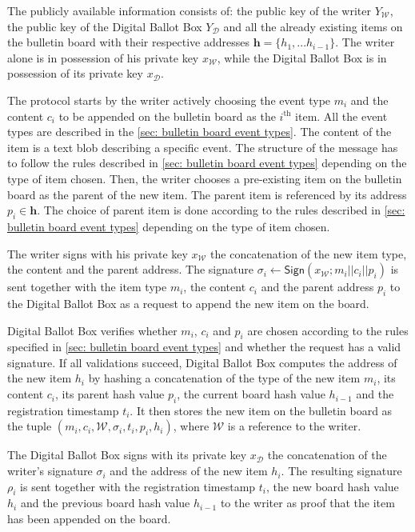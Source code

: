 The publicly available information consists of: the public key of the writer $Y_\mathcal{W}$, the public key of the Digital Ballot Box $Y_\mathcal{D}$ and all the already existing items on the bulletin board with their respective addresses $\boldsymbol{h} = \{h_1, ... h_{i-1}\}$. The writer alone is in possession of his private key $x_\mathcal{W}$, while the Digital Ballot Box is in possession of its private key $x_\mathcal{D}$.

The protocol starts by the writer actively choosing the event type $m_i$ and the content $c_i$ to be appended on the bulletin board as the $i^\mathrm{th}$ item. All the event types are described in the \cref{sec: bulletin board event types}. The content of the item is a text blob describing a specific event. The structure of the message has to follow the rules described in \cref{sec: bulletin board event types} depending on the type of item chosen. Then, the writer chooses a pre-existing item on the bulletin board as the parent of the new item. The parent item is referenced by its address $p_i \in \boldsymbol{h}$. The choice of parent item is done according to the rules described in \cref{sec: bulletin board event types} depending on the type of item chosen.

The writer signs with his private key $x_\mathcal{W}$ the concatenation of the new item type, the content and the parent address. The signature $\sigma_i \gets \mathsf{Sign}(x_\mathcal{W}; m_i || c_i || p_i)$ is sent together with the item type $m_i$, the content $c_i$ and the parent address $p_i$ to the Digital Ballot Box as a request to append the new item on the board.

Digital Ballot Box verifies whether $m_i$, $c_i$ and $p_i$ are chosen according to the rules specified in \cref{sec: bulletin board event types} and whether the request has a valid signature. If all validations succeed, Digital Ballot Box computes the address of the new item $h_i$ by hashing a concatenation of the type of the new item $m_i$, its content $c_i$, its parent hash value $p_i$, the current board hash value $h_{i-1}$ and the registration timestamp $t_i$. It then stores the new item on the bulletin board as the tuple $(m_i, c_i, \mathcal{W}, \sigma_i, t_i, p_i, h_i)$, where $\mathcal{W}$ is a reference to the writer.

The Digital Ballot Box signs with its private key $x_\mathcal{D}$ the concatenation of the writer's signature $\sigma_i$ and the address of the new item $h_i$. The resulting signature $\rho_i$ is sent together with the registration timestamp $t_i$, the new board hash value $h_i$ and the previous board hash value $h_{i-1}$ to the writer as proof that the item has been appended on the board.


